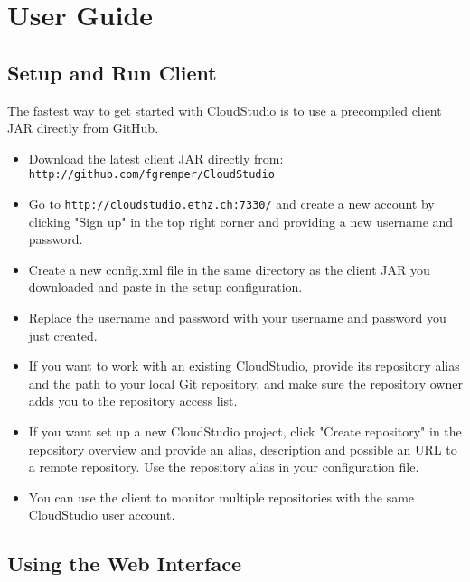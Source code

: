 

\chapter{User Guide}\label{userguide}





\section{Setup and Run Client}

The fastest way to get started with CloudStudio is to use a precompiled client JAR directly from GitHub.

\begin{itemize}

\item Download the latest client JAR directly from: \newline \texttt{http://github.com/fgremper/CloudStudio}

\item Go to \texttt{http://cloudstudio.ethz.ch:7330/} and create a new account by clicking "Sign up" in the top right corner and providing a new username and password.

\item Create a new config.xml file in the same directory as the client JAR you downloaded and paste in the setup configuration.

\item Replace the username and password with your username and password you just created.

\item If you want to work with an existing CloudStudio, provide its repository alias and the path to your local Git repository, and make sure the repository owner adds you to the repository access list.

\item If you want set up a new CloudStudio project, click "Create repository" in the repository overview and provide an alias, description and possible an URL to a remote repository. Use the repository alias in your configuration file.

\item You can use the client to monitor multiple repositories with the same CloudStudio user account.

\end{itemize}

\section{Using the Web Interface}\label{webinterfaceguide}
